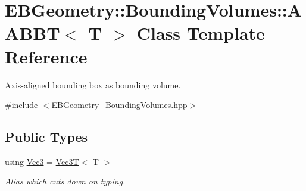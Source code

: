 \hypertarget{classEBGeometry_1_1BoundingVolumes_1_1AABBT}{}\section{E\+B\+Geometry\+:\+:Bounding\+Volumes\+:\+:A\+A\+B\+BT$<$ T $>$ Class Template Reference}
\label{classEBGeometry_1_1BoundingVolumes_1_1AABBT}


Axis-\/aligned bounding box as bounding volume.  




{\ttfamily \#include $<$E\+B\+Geometry\+\_\+\+Bounding\+Volumes.\+hpp$>$}

\subsection*{Public Types}
\begin{DoxyCompactItemize}
\item 
\mbox{\label{classEBGeometry_1_1BoundingVolumes_1_1AABBT_af139f618de2c5138990a63e93eb7d066}} 
using \hyperlink{classEBGeometry_1_1BoundingVolumes_1_1AABBT_af139f618de2c5138990a63e93eb7d066}{Vec3} = \hyperlink{classVec3T}{Vec3T}$<$ T $>$
\begin{DoxyCompactList}\small\item\em Alias which cuts down on typing. \end{DoxyCompactList}\end{DoxyCompactItemize}

